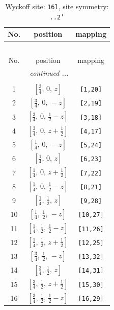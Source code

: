 \documentclass[fleqn,8pt]{jsarticle}
\begin{document}
\renewcommand{\arraystretch}{1.2}
\begin{longtable}{ccc}
\caption{Wyckoff site: {\tt 16l}, site symmetry: {\tt ..2'}}
 \\
 \hline \hline
No. & position & mapping \\ \hline \endfirsthead

\multicolumn{2}{l}{\tablename\ \thetable{}} \\
 \hline \hline
No. & position & mapping \\ \hline \endhead

 \hline \hline
\multicolumn{2}{r}{\footnotesize\it continued ...} \\ \endfoot

 \hline \hline
\multicolumn{2}{r}{} \\ \endlastfoot

1 & $\left[ \frac{3}{4},\, 0,\, z \right]$ & {\tt [1,20]} \\ \hline
2 & $\left[ \frac{3}{4},\, 0,\, - z \right]$ & {\tt [2,19]} \\ \hline
3 & $\left[ \frac{3}{4},\, 0,\, \frac{1}{2} - z \right]$ & {\tt [3,18]} \\ \hline
4 & $\left[ \frac{3}{4},\, 0,\, z + \frac{1}{2} \right]$ & {\tt [4,17]} \\ \hline
5 & $\left[ \frac{1}{4},\, 0,\, - z \right]$ & {\tt [5,24]} \\ \hline
6 & $\left[ \frac{1}{4},\, 0,\, z \right]$ & {\tt [6,23]} \\ \hline
7 & $\left[ \frac{1}{4},\, 0,\, z + \frac{1}{2} \right]$ & {\tt [7,22]} \\ \hline
8 & $\left[ \frac{1}{4},\, 0,\, \frac{1}{2} - z \right]$ & {\tt [8,21]} \\ \hline
9 & $\left[ \frac{1}{4},\, \frac{1}{2},\, z \right]$ & {\tt [9,28]} \\ \hline
10 & $\left[ \frac{1}{4},\, \frac{1}{2},\, - z \right]$ & {\tt [10,27]} \\ \hline
11 & $\left[ \frac{1}{4},\, \frac{1}{2},\, \frac{1}{2} - z \right]$ & {\tt [11,26]} \\ \hline
12 & $\left[ \frac{1}{4},\, \frac{1}{2},\, z + \frac{1}{2} \right]$ & {\tt [12,25]} \\ \hline
13 & $\left[ \frac{3}{4},\, \frac{1}{2},\, - z \right]$ & {\tt [13,32]} \\ \hline
14 & $\left[ \frac{3}{4},\, \frac{1}{2},\, z \right]$ & {\tt [14,31]} \\ \hline
15 & $\left[ \frac{3}{4},\, \frac{1}{2},\, z + \frac{1}{2} \right]$ & {\tt [15,30]} \\ \hline
16 & $\left[ \frac{3}{4},\, \frac{1}{2},\, \frac{1}{2} - z \right]$ & {\tt [16,29]} \\
\end{longtable}
\end{document}
